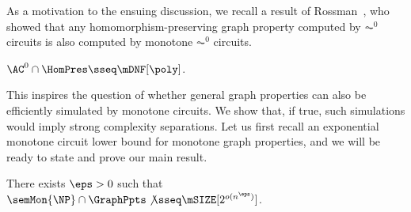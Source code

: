 \documentclass[11pt]{article}
\begin{document}
As a motivation to 
the ensuing discussion,
we recall a result of
Rossman~\cite{rossman_2008},
who 
showed that any homomorphism-preserving
graph property computed by \(\AC^0\) circuits is also computed
by monotone \(\AC^0\) circuits.

\begin{theorem}
    \label{t:ros08}
    $\AC^0
    \cap 
    \HomPres 
    \sseq \mDNF[\poly]$.
\end{theorem}

This inspires the question of whether general graph properties
can also be efficiently simulated by monotone circuits.
We show that, if true,
such simulations would imply strong complexity separations.
Let us first recall an exponential monotone circuit lower bound for
monotone graph properties, and we will be ready to state and prove our main
result.


\begin{theorem}
    \label{thm:ab-graph}
    There exists $\eps > 0$
    such that
    $\semMon{\NP} \cap \GraphPpts \not\sseq \mSIZE[2^{o(n^\eps)}]$.
\end{theorem}
\end{document}
